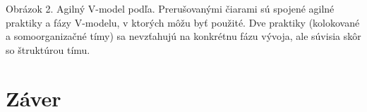 \documentclass[10pt,twoside,slovak,a4paper]{article}
\begin{document}
Obrázok 2. Agilný V-model podľa\cite{mchugh2013}. Prerušovanými čiarami sú spojené agilné praktiky a fázy V-modelu, v ktorých môžu byť použité. Dve praktiky (kolokované a somoorganizačné tímy) sa nevzťahujú na konkrétnu fázu vývoja, ale súvisia skôr so štruktúrou tímu.

\section{Záver}


\end{document}
